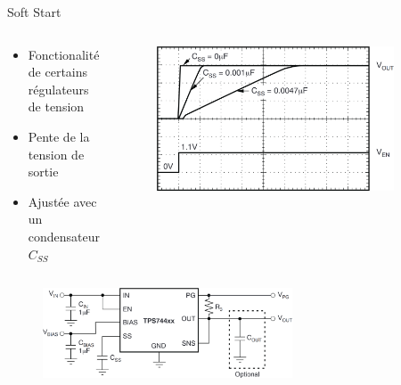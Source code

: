\begin{frame}{Soft Start}
    \begin{columns}
        \begin{column}{0.575\textwidth}    
            \begin{itemize}
                \item Fonctionalité de certains régulateurs de tension
                \item Pente de la tension de sortie
                \item Ajustée avec un condensateur $C_{SS}$
            \end{itemize}
        \end{column}
        \begin{column}{0.4\textwidth}
            \begin{figure}
                \centering
                \includegraphics[width=0.9\textwidth]{pictures/ic-soft-start-curve.png}
            \end{figure}
        \end{column}
    \end{columns}
    \vfill
    \begin{figure}
        \centering
        \includegraphics[width=0.66\textwidth]{pictures/ic-soft-start.png}
    \end{figure}
\end{frame}

